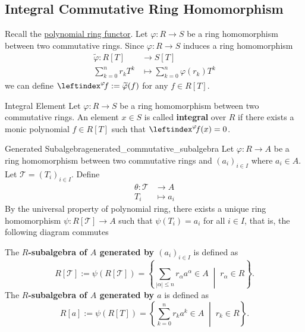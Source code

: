 \subsection{Integral Commutative Ring Homomorphism}

Recall the \hyperref[th:free_commutative_algebra]{polynomial ring functor}. Let $\varphi:R\to S$ be a ring homomorphism between two commutative rings. Since $\varphi:R\to S$ induces a ring homomorphism 
\begin{align*}
    \widetilde{\varphi}:R[T]& \longrightarrow S[T]\\
    \sum_{k=0}^n r_k T^k &\longmapsto \sum_{k=0}^n \varphi(r_k) T^k
\end{align*}
we can define $\leftindex^{\varphi}\!f:=\widetilde{\varphi}(f)$ for any $f\in R[T]$.

\begin{definition}{Integral Element}{}
    Let $\varphi:R\to S$ be a ring homomorphism between two commutative rings. An element $x\in S$ is called \textbf{integral} over $R$ if there exists a monic polynomial $f\in R[T]$ such that $\leftindex^{\varphi}\!f(x)=0$.
\end{definition}



\begin{definition}{Generated Subalgebra}{generated_commutative_subalgebra}
    Let $\varphi:R\to A$ be a ring homomorphism between two commutative rings and $(a_i)_{i\in I}$ where $a_i\in A$. Let $\mathcal{T}=(T_i)_{i\in I}$. Define
    \begin{align*}
        \theta: \mathcal{T}&\longrightarrow A\\
        T_i&\longmapsto a_i
    \end{align*}
    By the universal property of polynomial ring, there exists a unique ring homomorphism $\psi:R[\mathcal{T}]\to A$ such that 
    $\psi(T_i)=a_i$ for all $i\in I$, that is, the following diagram commutes
    \begin{center}
    \end{center}
    The \textbf{$R$-subalgebra of $A$ generated by $(a_i)_{i\in I}$} is defined as 
    \[
    R[\mathcal{T}]:=\psi\left(R[\mathcal{T}]\right)=\left\{ \sum_{|\alpha|\le n} r_{\alpha} a^{\alpha} \in A\;\middle|\; r_{\alpha}\in R\right\}.
    \]
    The \textbf{$R$-subalgebra of $A$ generated by $a$} is defined as 
    \[
    R[a]:=\psi\left(R[T]\right)=\left\{\sum_{k=0}^n r_k a^k \in A\;\middle|\; r_k\in R\right\}.
    \]
\end{definition}

